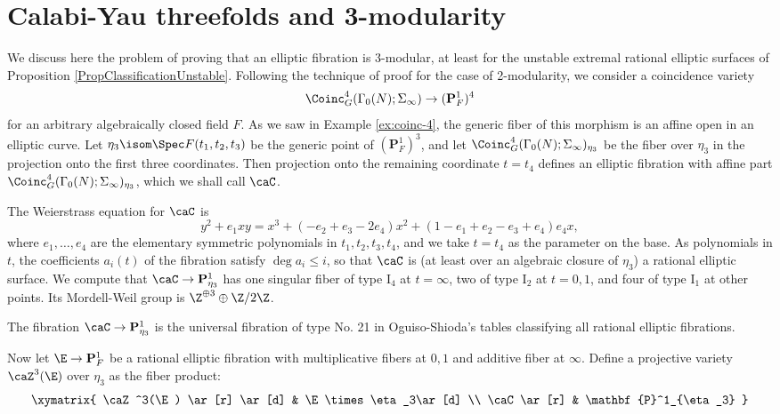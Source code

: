 \documentclass{article}
\def\P{\mathbf{P}}
\newcommand{\I}{\mathrm{I}}
\begin{document}
\section{Calabi-Yau threefolds and 3-modularity}

We discuss here the problem of proving that an elliptic fibration is 3-modular, at least for the unstable extremal rational elliptic surfaces of Proposition \ref{PropClassificationUnstable}.  Following the technique of proof for the case of 2-modularity, we consider a coincidence variety
\[ \Coinc_G^4(\Gamma_0(N);\Sigma_\infty)\to (\P^1_F)^4 \]
for an arbitrary algebraically closed field $F$.
As we saw in Example \ref{ex:coinc-4}, the generic fiber of this morphism is an affine open in an elliptic curve.  Let $\eta_3\isom \Spec F(t_1,t_2,t_3)$ be the generic point of $(\P^1_F)^3$, and let $\Coinc_G^4(\Gamma_0(N);\Sigma_\infty)_{\eta_3}$ be the fiber over $\eta_3$ in the projection onto the first three coordinates.  Then projection onto the remaining coordinate $t=t_4$ defines an elliptic fibration with affine part $\Coinc_G^4(\Gamma_0(N);\Sigma_\infty)_{\eta_3}$, which we shall call $\caC$.

The Weierstrass equation for $\caC$ is  
\[ y^2 +e_1xy = x^3 + (-e_2+e_3-2e_4)x^2 + (1-e_1+e_2-e_3+e_4)e_4x,\]
where $e_1,\dots,e_4$ are the elementary symmetric polynomials in
$t_1,t_2,t_3,t_4$, and we take $t=t_4$ as the parameter on the base. 
As polynomials in $t$, the coefficients $a_i(t)$ of the fibration satisfy $\deg a_i\leq i$, so that $\caC$ is (at least over an algebraic closure of $\eta_3$) a rational elliptic surface.  We compute that $\caC\to\P^1_{\eta_3}$ has one singular fiber of type $\I_4$ at $t=\infty$, two of type $\I_2$ at $t=0,1$, and four of type $\I_1$ at other points.  Its Mordell-Weil group is $\Z^{\oplus 3} \oplus \Z/2\Z$.

\begin{rmk}  The fibration $\caC\to\P^1_{\eta_3}$ is the universal fibration of type No. 21 in Oguiso-Shioda's tables \cite{Oguiso-Shioda:RES} classifying all rational elliptic fibrations.
\end{rmk}


Now let $\E\to \P^1_F$ be a rational elliptic fibration with multiplicative fibers at $0,1$ and additive fiber at $\infty$.  Define a projective variety $\caZ^3(\E)$ over $\eta_3$ as the fiber product:
\begin{equation}
\label{DefnZrE}
\xymatrix{
\caZ^3(\E) \ar[r] \ar[d] & \E \times\eta_3\ar[d] \\
\caC \ar[r]  & \P^1_{\eta_3} 
}
\end{equation}
\end{document}
